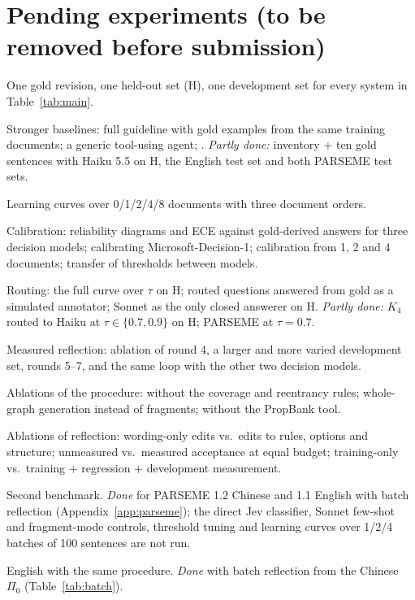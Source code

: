 \section{Pending experiments (to be removed before submission)}
\label{app:pending}
\begin{description}[leftmargin=1em,itemsep=1pt,font=\normalfont\bfseries]
  \item[E1] One gold revision, one held-out set (H), one development set for every system in Table~\ref{tab:main}.
  \item[E2] Stronger baselines: full guideline with gold examples from the same training documents; a generic tool-using agent; \citet{chun2024pipeline}. \emph{Partly done:} inventory + ten gold sentences with Haiku 5.5 on H, the English \umr test set and both PARSEME test sets.
  \item[E3] Learning curves over 0/1/2/4/8 documents with three document orders.
  \item[E4] Calibration: reliability diagrams and ECE against gold-derived answers for three decision models; calibrating Microsoft-Decision-1; calibration from 1, 2 and 4 documents; transfer of thresholds between models.
  \item[E5] Routing: the full curve over $\tau$ on H; routed questions answered from gold as a simulated annotator; Sonnet as the only closed answerer on H. \emph{Partly done:} $K_4$ routed to Haiku at $\tau\in\{0.7, 0.9\}$ on H; PARSEME at $\tau{=}0.7$.
  \item[E6] Measured reflection: ablation of round 4, a larger and more varied development set, rounds 5--7, and the same loop with the other two decision models.
  \item[E7] Ablations of the procedure: without the coverage and reentrancy rules; whole-graph generation instead of fragments; without the PropBank tool.
  \item[E8] Ablations of reflection: wording-only edits vs.\ edits to rules, options and structure; unmeasured vs.\ measured acceptance at equal budget; training-only vs.\ training + regression + development measurement.
  \item[E9] Second benchmark. \emph{Done} for PARSEME 1.2 Chinese and 1.1 English with batch reflection (Appendix~\ref{app:parseme}); the direct Jev classifier, Sonnet few-shot and fragment-mode controls, threshold tuning and learning curves over 1/2/4 batches of 100 sentences are not run.
  \item[E10] English \umr with the same procedure. \emph{Done} with batch reflection from the Chinese $\Pi_0$ (Table~\ref{tab:batch}).

\end{description}
